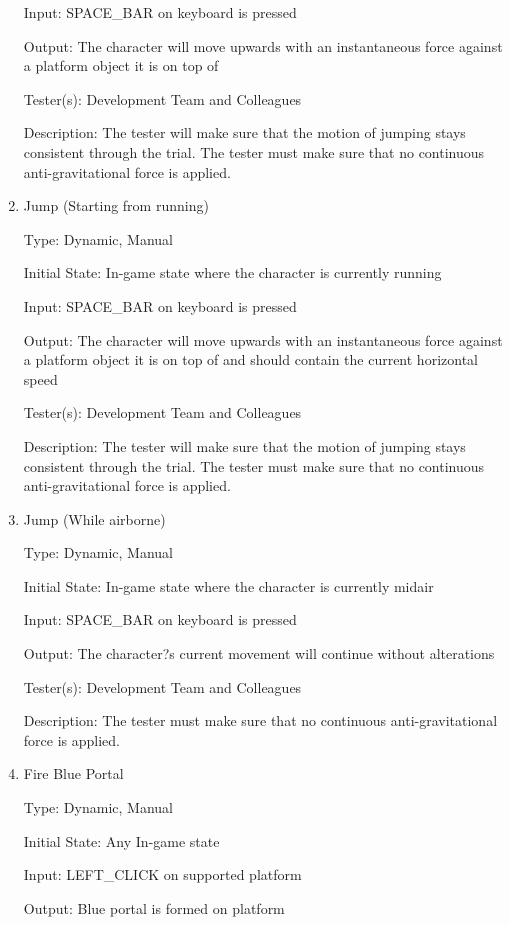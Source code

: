 \documentclass[12pt, titlepage]{article}
\begin{document}
\begin{enumerate}
Input: SPACE\_BAR on keyboard is pressed

Output: The character will move upwards with an instantaneous force against a platform object it is on top of

Tester(s): Development Team and Colleagues

Description: The tester will make sure that the motion of jumping stays consistent through the trial. The tester must make sure that no continuous anti-gravitational force is applied. 

\item{Jump (Starting from running)\\}

Type: Dynamic, Manual

Initial State: In-game state where the character is currently running

Input: SPACE\_BAR on keyboard is pressed

Output: The character will move upwards with an instantaneous force against a platform object it is on top of and should contain the current horizontal speed

Tester(s): Development Team and Colleagues

Description: The tester will make sure that the motion of jumping stays consistent through the trial. The tester must make sure that no continuous anti-gravitational force is applied.

\item{Jump (While airborne)\\}

Type: Dynamic, Manual

Initial State: In-game state where the character is currently midair

Input: SPACE\_BAR on keyboard is pressed

Output: The character?s current movement will continue without alterations

Tester(s): Development Team and Colleagues

Description: The tester must make sure that no continuous anti-gravitational force is applied.

\item{Fire Blue Portal\\}

Type: Dynamic, Manual

Initial State: Any In-game state

Input: LEFT\_CLICK on supported platform

Output: Blue portal is formed on platform


\end{enumerate}
\end{document}
